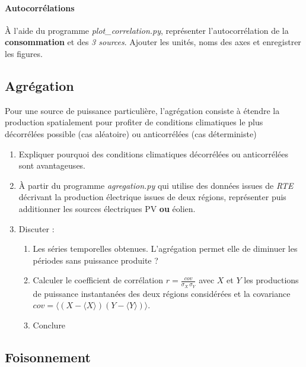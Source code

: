 \documentclass[12pt,a4,french]{article}
\newcommand{\tmtextbf}[1]{{\bfseries{#1}}}
\newcommand{\tmtextit}[1]{{\itshape{#1}}}
\begin{document}
\paragraph{Autocorrélations} À l'aide du programme \tmtextit{plot\_correlation.py}, représenter l'autocorrélation de la \tmtextbf{consommation} et des \textit{3 sources}. 
Ajouter les unités, noms des axes et enregistrer les figures. \\

\subsection{Agrégation}

Pour une source de puissance particulière, l'agrégation consiste à étendre la production spatialement pour profiter de conditions climatiques le plus décorrélées possible (cas aléatoire) ou anticorrélées (cas déterministe)
\begin{enumerate}
	\item Expliquer pourquoi des conditions climatiques décorrélées ou anticorrélées sont avantageuses.
	
  \item À partir du programme \tmtextit{agregation.py} qui utilise des
  données issues de \tmtextit{RTE} décrivant la production électrique
  issues de deux régions, représenter puis additionner les sources
  électriques PV \textbf{ou} éolien.
  
  \item Discuter :
  \begin{enumerate}
    \item Les séries temporelles obtenues. L'agrégation permet elle de diminuer les périodes sans puissance produite ?
        
    \item Calculer le coefficient de corrélation $r=\frac{cov}{\sigma_X \, \sigma_Y}$ avec $X$ et $Y$ les productions de puissance instantanées des deux régions considérées et la covariance $cov=\langle (X-\langle X \rangle)(Y-\langle Y \rangle) \rangle$.
    
    \item Conclure
    
  \end{enumerate}
\end{enumerate}

\subsection{Foisonnement}
\end{document}
